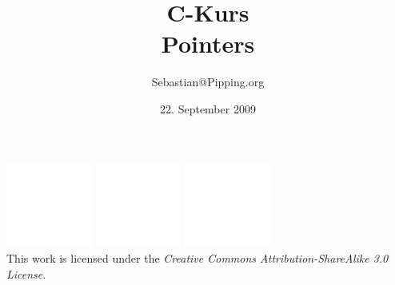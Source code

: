\documentclass{beamer}
\title{C-Kurs\\Pointers}
\author{Sebastian@Pipping.org}
\date{22. September 2009}
\newcommand{\CcLongnameBySa}{Attribution-ShareAlike}
\newcommand{\CcImageBy}[1]{%
	\includegraphics[scale=#1]{creative-commons/cc-by-white.pdf}%
}
\newcommand{\CcImageNc}[1]{%
	\includegraphics[scale=#1]{creative-commons/cc-nc-white.pdf}%
}
\newcommand{\CcImageSa}[1]{%
	\includegraphics[scale=#1]{creative-commons/cc-sa-white.pdf}%
}
\newcommand{\CcNote}[1]{%
	This work is licensed under the \textit{Creative Commons #1 3.0 License}.%
}
\newcommand{\CcGroupByNcSa}[2]{%
	\CcImageBy{#1}\hspace*{#2}\CcImageNc{#1}\hspace*{#2}\CcImageSa{#1}%
}
\begin{document}

\begin{frame}
	\titlepage
	\vfill
	\begin{center}
		\CcGroupByNcSa{0.33}{0.95ex}\\[2.5ex]
		{\tiny\CcNote{\CcLongnameBySa}}
		\vspace*{-2.5ex}
	\end{center}
\end{frame}


\end{document}
